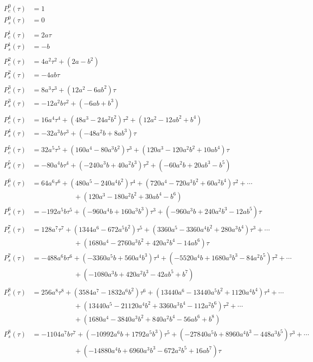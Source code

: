 \documentclass[]{article}
\begin{document}
\begin{align*}
P_c^0(\tau) &= 1\\
P_s^0(\tau) &= 0\\
&\\
P_c^1(\tau) &= 2a\tau\\
P_s^1(\tau) &= -b\\
&\\
P_c^2(\tau) &= 4a^2\tau^2+(2a-b^2)\\
P_s^2(\tau) &= -4ab\tau\\
&\\
P_c^3(\tau) &= 8a^3\tau^3+(12a^2-6ab^2)\tau\\
P_s^3(\tau) &= -12a^2b\tau^2+(-6ab+b^3)\\
&\\
P_c^4(\tau) &= 16a^4\tau^4+(48a^3-24a^2b^2)\tau^2+(12a^2-12ab^2+b^4)\\
P_s^4(\tau) &= -32a^3b\tau^3 + (-48a^2b+8ab^3)\tau\\
&\\
P_c^5(\tau) &= 32a^5\tau^5+(160a^4-80a^3b^2)\tau^3+(120a^3-120a^2b^2+10ab^4)\tau\\
P_s^5(\tau) &= -80a^4b\tau^4+(-240a^3b+40a^2b^3)\tau^2+(-60a^2b+20ab^3-b^5)\\
&\\
P_c^6(\tau) &= 64a^6\tau^6+(480a^5-240a^4b^2)\tau^4 + (720a^4-720a^3b^2+60a^2b^4)\tau^2+\cdots\\
&\hspace{1in}+(120a^3-180a^2b^2+30ab^4-b^6)\\
P_s^6(\tau) &= -192a^5b\tau^5+ (-960a^4b+160a^3b^3)\tau^3+(-960a^3b+240a^2b^3-12ab^5)\tau\\
&\\
P_c^7(\tau) &= 128a^7\tau^7+(1344a^6-672a^5b^2)\tau^5+(3360a^5-3360a^4b^2+280a^3b^4)\tau^3 +\cdots\\ &\hspace{1in}+(1680a^4-2760a^3b^2+420a^2b^4-14ab^6)\tau\\
P_s^7(\tau) &= -488a^6b\tau^6+(-3360a^5b+560a^4b^3)\tau^4+(-5520a^4b+1680a^3b^3-84a^2b^5)\tau^2+\cdots\\
&\hspace{1in}+(-1080a^3b+420a^2b^3-42ab^5+b^7)\\
&\\
P_c^8(\tau) &= 256a^8\tau^8+(3584a^7-1832a^6b^2)\tau^6+(13440a^6-13440a^5b^2+1120a^4b^4)\tau^4+\cdots\\
&\hspace{1in}+(13440a^5-21120a^4b^2+3360a^3b^4-112a^2b^6)\tau^2+\cdots\\
&\hspace{1in}+(1680a^4-3840a^3b^2+840a^2b^4-56ab^6+b^8)\\
P_s^8(\tau) &= -1104a^7b\tau^7 + (-10992a^6b+1792a^5b^3)\tau^5+(-27840a^5b+8960a^4b^3-448a^3b^5)\tau^3+\cdots\\
&\hspace{1in}+(-14880a^4b+6960a^3b^3-672a^2b^5+16ab^7)\tau
\end{align*}
\end{document}

